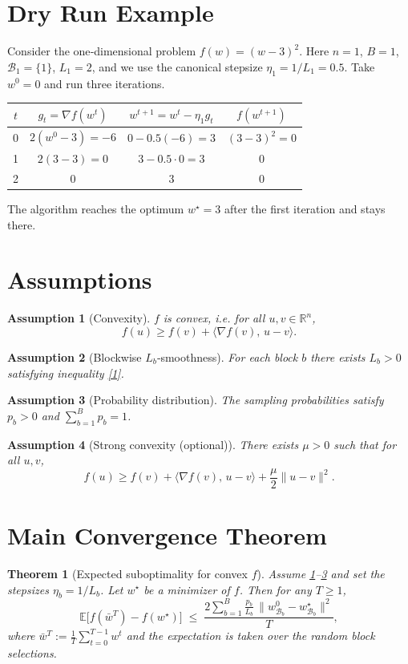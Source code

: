 \documentclass[11pt]{article}
\newtheorem{theorem}{Theorem}
\newtheorem{assumption}{Assumption}
\newcommand{\E}{\mathbb{E}}
\newcommand{\R}{\mathbb{R}}
\begin{document}
\section*{Dry Run Example}
Consider the one‑dimensional problem $f(w)=(w-3)^{2}$.
Here $n=1$, $B=1$, $\mathcal{B}_{1}=\{1\}$, $L_{1}=2$, and we use the
canonical stepsize $\eta_{1}=1/L_{1}=0.5$.
Take $w^{0}=0$ and run three iterations.

\begin{center}
\begin{tabular}{c|c|c|c}
$t$ & $g_{t}=\nabla f(w^{t})$ & $w^{t+1}=w^{t}-\eta_{1}g_{t}$ & $f(w^{t+1})$\\ \hline
0 & $2(w^{0}-3)=-6$ & $0-0.5(-6)=3$ & $(3-3)^{2}=0$\\
1 & $2(3-3)=0$ & $3-0.5\cdot0=3$ & $0$\\
2 & $0$ & $3$ & $0$
\end{tabular}
\end{center}
The algorithm reaches the optimum $w^{\star}=3$ after the first
iteration and stays there.

\newpage
\section*{Assumptions}
\begin{assumption}[Convexity]\label{ass:convex}
$f$ is convex, i.e. for all $u,v\in\R^{n}$,
\[
f(u)\ge f(v)+\langle \nabla f(v),\,u-v\rangle .
\tag{A1}
\]
\end{assumption}
\begin{assumption}[Blockwise $L_{b}$‑smoothness]\label{ass:smooth}
For each block $b$ there exists $L_{b}>0$ satisfying inequality \eqref{1}.
\end{assumption}
\begin{assumption}[Probability distribution]\label{ass:prob}
The sampling probabilities satisfy $p_{b}>0$ and $\sum_{b=1}^{B}p_{b}=1$.
\end{assumption}
\begin{assumption}[Strong convexity (optional)]\label{ass:strong}
There exists $\mu>0$ such that for all $u,v$,
\[
f(u)\ge f(v)+\langle \nabla f(v),\,u-v\rangle
+\frac{\mu}{2}\|u-v\|^{2}.
\tag{A4}
\]
\end{assumption}

\section*{Main Convergence Theorem}
\begin{theorem}[Expected suboptimality for convex $f$]\label{thm:convex}
Assume \ref{ass:convex}–\ref{ass:prob} and set the stepsizes
$\eta_{b}=1/L_{b}$.  Let $w^{\star}$ be a minimizer of $f$.  Then for any
$T\ge 1$,
\[
\E\!\bigl[f(\bar w^{T})-f(w^{\star})\bigr]
\;\le\;
\frac{2\displaystyle\sum_{b=1}^{B}\frac{p_{b}}{L_{b}}\,
\|w^{0}_{\mathcal{B}_{b}}-w^{\star}_{\mathcal{B}_{b}}\|^{2}}
{T},
\tag{3}
\]
where $\bar w^{T}:=\frac1T\sum_{t=0}^{T-1}w^{t}$ and the expectation is taken over the random block selections.
\end{theorem}
\end{document}
